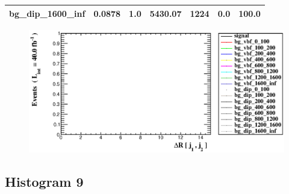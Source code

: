 \documentclass[a4paper, 10pt]{article}
\begin{document}
\begin{table}[H]
\begin{center}
\begin{tabular}{|m{23.0mm}|m{23.0mm}|m{18.0mm}|m{19.0mm}|m{19.0mm}|m{19.0mm}|m{19.0mm}|}
      \hline
      {\cellcolor{white}         bg\_dip\_1600\_inf}& {\cellcolor{white}         0.0878}& {\cellcolor{white}         1.0}& {\cellcolor{white}         5430.07}& {\cellcolor{white}         1224}& {\cellcolor{red}         0.0}& {\cellcolor{red}         100.0}\\
\hline
    \end{tabular}
  \end{center}
\end{table}

\begin{figure}[H]
  \begin{center}
    \includegraphics[scale=0.45]{selection_7.eps}\\
\caption{   }
  \end{center}
\end{figure}
      \newpage
\subsection{ Histogram 9}
\end{document}
